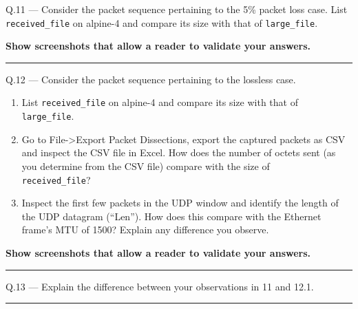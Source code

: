 \documentclass{article}
\newcommand\Que[2]{%
   \begin{samepage}
   \leavevmode\par
   \noindent
   Q.#1 --- #2\par\vspace{10pt}\hrule\vspace{10pt}
   \end{samepage}}
\begin{document}

\Que{11}{
Consider the packet sequence pertaining to the 5\% packet loss
case. List \texttt{received\_file} on alpine-4 and compare its
size with that of \texttt{large\_file}.

\textbf{Show screenshots that allow a reader to validate your
answers.}}

\Que{12}{
Consider the packet sequence pertaining to the lossless case.
\begin{enumerate}
\item List \texttt{received\_file} on alpine-4 and compare its
      size with that of \\ \texttt{large\_file}.
\item Go to File->Export Packet Dissections, export the captured
      packets as CSV and inspect the CSV file in Excel. How does
      the number of octets sent (as you determine from the CSV
      file) compare with the size of\\ \texttt{received\_file}?
\item Inspect the first few packets in the UDP window and
      identify the length of the UDP datagram (``Len''). How does
      this compare with the Ethernet frame's MTU of 1500? Explain
      any difference you observe.
\end{enumerate}

\textbf{Show screenshots that allow a reader to validate your answers.}}

\Que{13}{Explain the difference between your observations in 11
and 12.1.}
\end{document}
